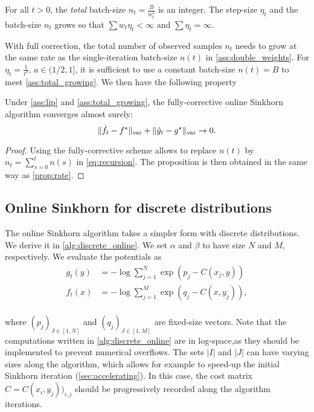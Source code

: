 \begin{assumption}\label{ass:total_growing}
    For all $t > 0$, the \textit{total} batch-size $n_t = \frac{B}{w_t^2}$ is an
        integer. The step-size $\eta_t$ and the batch-size $n_t$ grows so that
        $\sum w_t \eta_t < \infty$ and $\sum \eta_t = \infty$.
\end{assumption}

With full correction, the total number of observed samples $n_t$ needs to grow
at the same rate as the single-iteration batch-size $n(t)$ in
\autoref{ass:double_weights}. For $\eta_t = \frac{1}{t^a}$, $a \in (1/2, 1]$, it
is sufficient to use a constant batch-size $n(t) = B$ to meet \autoref{ass:total_growing}. We then have the following property

\begin{proposition}
    Under \autoref{ass:lip} and
    \ref{ass:total_growing}, the fully-corrective online Sinkhorn algorithm converges almost surely:
    \begin{equation}
        \Vert \hat f_t - f^\star \Vert_{\text{\upshape var}} + \Vert \hat g_t - g^\star \Vert_{\text{\upshape var}} \to 0.
    \end{equation}
\end{proposition}

\begin{proof}
    Using the fully-corrective scheme allows to replace $n(t)$ by $n_t =
    \sum_{s=0}^t n(s)$ in \eqref{eq:recursion}. The proposition is then obtained
    in the same way as \autoref{prop:rate}.
\end{proof}



\subsection{Online Sinkhorn for discrete distributions}\label{sec:sinkhorn_discrete}

The online Sinkhorn algorithm takes a simpler form with discrete
distributions. We derive it in \autoref{alg:discrete_online}. We set $\alpha$
and $\beta$ to have size $N$ and $M$, respectively. We evaluate
the potentials as
\begin{align}
    g_t(y) &= - \log \sum_{j=1}^N \exp(p_j - C(x_j, y)) \\
    f_t(x) &= - \log \sum_{j=1}^M \exp(q_j - C(x, y_j)), \\
\end{align}

\vspace{-2em}
where $(p_j)_{J \in [1, N]}$ and $(q_j)_{J \in [1, M]}$ are fixed-size vectors.
Note that the computations written in \autoref{alg:discrete_online} are
in log-space,as they should be implemented to prevent numerical overflows. The sets $|I|$ and $|J|$ can
have varying sizes along the algorithm, which allows for example to speed-up the
initial Sinkhorn iteration (\autoref{sec:accelerating}). In this case, the
cost matrix $\hat C = C(x_i,y_j))_{i,j}$ should be progressively recorded along the algorithm iterations.

